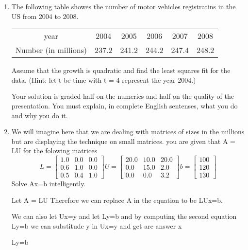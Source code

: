 \documentclass{article}
\begin{document}
\begin{enumerate}
  \item The following table showes the number of motor vehicles registratins in the US from 2004 to 2008.\

    \begin{center}
      \begin{tabular}{ c|ccccc } 
        \hline
        year & 2004 & 2005  & 2006 & 2007 & 2008\\ 
        Number (in millions) & 237.2 & 241.2 & 244.2 & 247.4 & 248.2 \\ 
        \hline
      \end{tabular}
    \end{center}

    Assume that the growth is quadratic and find the least squares fit for the data. (Hint: let t be time with t = 4 represent the year 2004.)
    \par
    Your solution is graded half on the numerics and half on the quality of the presentation. You must explain, in complete English sentenses, what you do and why you do it.
  \item We will imagine here that we are dealing with matrices of sizes in the millions but are displaying the technique on small matrices. you are given that A = LU for the folowing matrices
    \[
      L = 
      \begin{bmatrix}
        1.0 & 0.0 & 0.0 \\
        0.6 & 1.0 & 0.0 \\
        0.5 & 0.4 & 1.0 
      \end{bmatrix}
      U = 
      \begin{bmatrix}
        20.0 & 10.0 & 20.0 \\
        0.0 & 15.0 & 2.0 \\
        0.0 & 0.0 & 3.2 
      \end{bmatrix}
      b = 
      \begin{bmatrix}
        100 \\
        120 \\
        130 
      \end{bmatrix}
    \]
    Solve Ax=b intelligently.
    \par
    Let A = LU Therefore we can replace A in the equation to be LUx=b.
    \par
    We can also let Ux=y and let Ly=b and by computing the second equation Ly=b we can substitude y in Ux=y and get are answer x
    \begin{center}
      Ly=b
    \end{center}

\end{enumerate}
\end{document}
